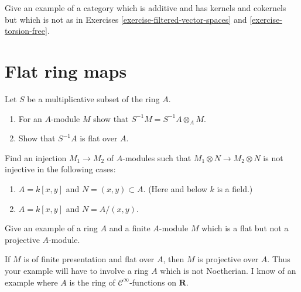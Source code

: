 \begin{exercise}
\label{exercise-other}
Give an example of a category which is additive and has kernels
and cokernels but which is not as in
Exercises \ref{exercise-filtered-vector-spaces} and
\ref{exercise-torsion-free}.
\end{exercise}






\section{Flat ring maps}
\label{section-flat}

\begin{exercise}
\label{exercise-localization-flat}
Let $S$ be a multiplicative subset of the ring $A$.
\begin{enumerate}
\item For an $A$-module $M$ show that $S^{-1}M = S^{-1}A \otimes_A M$.
\item Show that $S^{-1}A$ is flat over $A$.
\end{enumerate}
\end{exercise}

\begin{exercise}
\label{exercise-examples-not-flat}
Find an injection $M_1 \to M_2$ of $A$-modules such that
$M_1\otimes N \to M_2 \otimes N$ is not injective in the following
cases:
\begin{enumerate}
\item $A = k[x, y]$ and $N = (x, y) \subset A$. (Here and below $k$ is a field.)
\item $A = k[x, y]$ and $N = A/(x, y)$.
\end{enumerate}
\end{exercise}

\begin{exercise}
\label{exercise-flat-not-projective}
Give an example of a ring $A$ and a finite $A$-module $M$
which is a flat but not a projective $A$-module.
\end{exercise}

\begin{remark}
\label{remark-flat-not-projective}
If $M$ is of finite presentation and flat over $A$,
then $M$ is projective over $A$. Thus your example will have to
involve a ring $A$ which is not Noetherian. I know of an example
where $A$ is the ring of ${\mathcal C}^\infty$-functions on ${\mathbf R}$.
\end{remark}


